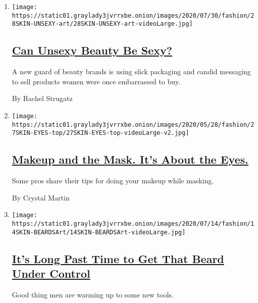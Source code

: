 \begin{enumerate}
\def\labelenumi{\arabic{enumi}.}
\item
  \texttt{[image: https://static01.graylady3jvrrxbe.onion/images/2020/07/30/fashion/28SKIN-UNSEXY-art/28SKIN-UNSEXY-art-videoLarge.jpg]}

  \hypertarget{can-unsexy-beauty-be-sexy}{%
  \subsection{\texorpdfstring{\href{/2020/07/28/style/can-unsexy-beauty-be-sexy.html}{Can
  Unsexy Beauty Be
  Sexy?}}{Can Unsexy Beauty Be Sexy?}}\label{can-unsexy-beauty-be-sexy}}

  A new guard of beauty brands is using slick packaging and candid
  messaging to sell products women were once embarrassed to buy.

  By Rachel Strugatz
\item
  \texttt{[image: https://static01.graylady3jvrrxbe.onion/images/2020/05/28/fashion/27SKIN-EYES-top/27SKIN-EYES-top-videoLarge-v2.jpg]}

  \hypertarget{makeup-and-the-mask-its-about-the-eyes}{%
  \subsection{\texorpdfstring{\href{/2020/05/26/style/makeup-and-the-mask-its-about-the-eyes.html}{Makeup
  and the Mask. It's About the
  Eyes.}}{Makeup and the Mask. It's About the Eyes.}}\label{makeup-and-the-mask-its-about-the-eyes}}

  Some pros share their tips for doing your makeup while masking.

  By Crystal Martin
\item
  \texttt{[image: https://static01.graylady3jvrrxbe.onion/images/2020/07/14/fashion/14SKIN-BEARDSArt/14SKIN-BEARDSArt-videoLarge.jpg]}

  \hypertarget{its-long-past-time-to-get-that-beard-under-control}{%
  \subsection{\texorpdfstring{\href{/2020/07/15/style/its-long-past-time-to-get-that-beard-under-control.html}{It's
  Long Past Time to Get That Beard Under
  Control}}{It's Long Past Time to Get That Beard Under Control}}\label{its-long-past-time-to-get-that-beard-under-control}}

  Good thing men are warming up to some new tools.


\end{enumerate}
